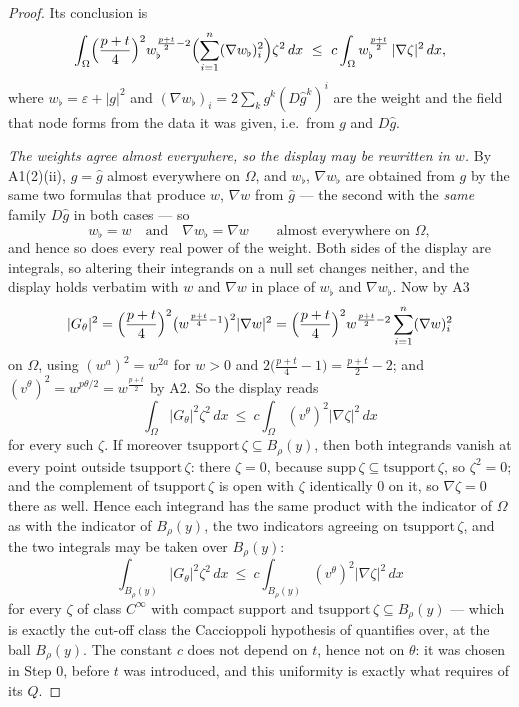 \begin{proof}
Its conclusion is
\[
\int_\Omega\Bigl(\frac{p+t}4\Bigr)^2w_\flat^{\frac{p+t}2-2}
\Bigl(\sum_{i=1}^n(\nabla w_\flat)_i^2\Bigr)\zeta^2\,dx
\ \le\ c\int_\Omega w_\flat^{\frac{p+t}2}\,|\nabla\zeta|^2\,dx ,
\]
where $w_\flat=\varepsilon+|g|^2$ and
$(\nabla w_\flat)_i=2\sum_kg^k(D\hat g^k)^i$ are the weight and the field that
node forms from the data it was given, i.e.\ from $g$ and $D\hat g$.

\emph{The weights agree almost everywhere, so the display may be rewritten in
$w$.}  By A1(2)(ii), $g=\hat g$ almost everywhere on $\Omega$, and $w_\flat$,
$\nabla w_\flat$ are obtained from $g$ by the same two formulas that produce
$w$, $\nabla w$ from $\hat g$ --- the second with the \emph{same} family
$D\hat g$ in both cases --- so
\[
w_\flat=w\quad\text{and}\quad\nabla w_\flat=\nabla w
\qquad\text{almost everywhere on }\Omega ,
\tag{A4b}
\]
and hence so does every real power of the weight.  Both sides of the display are
integrals, so altering their integrands on a null set changes neither, and the
display holds verbatim with $w$ and $\nabla w$ in place of $w_\flat$ and
$\nabla w_\flat$.  Now by A3
\[
|G_\theta|^2=\Bigl(\frac{p+t}4\Bigr)^2\bigl(w^{\frac{p+t}4-1}\bigr)^2|\nabla w|^2
=\Bigl(\frac{p+t}4\Bigr)^2w^{\frac{p+t}2-2}\sum_{i=1}^n(\nabla w)_i^2
\]
on $\Omega$, using $(w^a)^2=w^{2a}$ for $w>0$ and
$2\bigl(\frac{p+t}4-1\bigr)=\frac{p+t}2-2$; and
$(v^\theta)^2=w^{p\theta/2}=w^{\frac{p+t}2}$ by A2.  So the display reads
\[
\int_\Omega|G_\theta|^2\zeta^2\,dx
\ \le\ c\int_\Omega(v^\theta)^2|\nabla\zeta|^2\,dx
\]
for every such $\zeta$.  If moreover $\mathrm{tsupport}\,\zeta\subseteq
B_\rho(y)$, then both integrands vanish at every point outside
$\mathrm{tsupport}\,\zeta$: there $\zeta=0$, because
$\mathrm{supp}\,\zeta\subseteq\mathrm{tsupport}\,\zeta$, so $\zeta^2=0$; and the
complement of $\mathrm{tsupport}\,\zeta$ is open with $\zeta$ identically $0$ on
it, so $\nabla\zeta=0$ there as well.  Hence each integrand has the same product
with the indicator of $\Omega$ as with the indicator of $B_\rho(y)$, the two
indicators agreeing on $\mathrm{tsupport}\,\zeta$, and the two integrals may be
taken over $B_\rho(y)$:
\[
\int_{B_\rho(y)}|G_\theta|^2\zeta^2\,dx
\ \le\ c\int_{B_\rho(y)}(v^\theta)^2|\nabla\zeta|^2\,dx
\tag{A4}
\]
for every $\zeta$ of class $C^\infty$ with compact support and
$\mathrm{tsupport}\,\zeta\subseteq B_\rho(y)$ --- which is exactly the cut-off
class the Caccioppoli hypothesis of  quantifies
over, at the ball $B_\rho(y)$.  The constant $c$ does not depend on $t$, hence
not on $\theta$: it was chosen in Step 0, before $t$ was introduced, and this
uniformity is exactly what  requires of its $Q$.


\end{proof}
